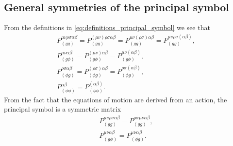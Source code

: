 \documentclass{ws-ijmpd}
\begin{document}
\subsection{General symmetries of the principal symbol}
From the definitions in \eqref{eq:definitions_principal_symbol}
we see that
\begin{subequations}
\begin{align}
   P_{(gg)}^{\mu\nu\rho\sigma\alpha\beta}
   =
   P_{(gg)}^{(\mu\nu)\rho\sigma\alpha\beta}
   =
   P_{(gg)}^{\mu\nu(\rho\sigma)\alpha\beta}
   =
   P_{(gg)}^{\mu\nu\rho\sigma(\alpha\beta)}
   ,\\
   P_{(g\phi)}^{\mu\nu\alpha\beta}
   =
   P_{(g\phi)}^{(\mu\nu)\alpha\beta}
   =
   P_{(g\phi)}^{\mu\nu(\alpha\beta)}
   ,\\
   P_{(\phi g)}^{\rho\sigma\alpha\beta}
   =
   P_{(\phi g)}^{(\rho\sigma)\alpha\beta}
   =
   P_{(\phi g)}^{\rho\sigma(\alpha\beta)}
   ,\\
   P_{(\phi\phi)}^{\alpha\beta}
   =
   P_{(\phi\phi)}^{(\alpha\beta)}
   .
\end{align}
\end{subequations}
From the fact that the equations of motion are derived from an action,
the principal symbol is a symmetric matrix 
\begin{subequations}
\begin{align}
   P_{(gg)}^{\mu\nu\rho\sigma\alpha\beta}
   =
   P_{(gg)}^{\rho\sigma\mu\nu\alpha\beta}
   ,\\
   P_{(g\phi)}^{\mu\nu\alpha\beta}
   =
   P_{(\phi g)}^{\mu\nu\alpha\beta}
   .
\end{align}
\end{subequations}
\end{document}
